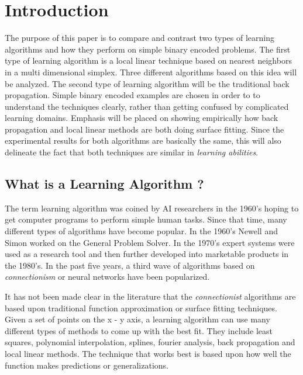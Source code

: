 \parskip 0.20in
\textheight 8.75in
\textwidth 6.0in
\topmargin -0.25in
\oddsidemargin 0.40in


\baselineskip 0.30in

\chapter{Introduction}
		
	The purpose of this paper is to compare and contrast two types
of learning algorithms and how they perform on simple binary encoded
problems.  The first type of learning algorithm is a local linear
technique based on nearest neighbors in a multi dimensional simplex.
Three different algorithms based on this idea will be analyzed.  The
second type of learning algorithm will be the traditional back
propagation.  Simple binary encoded examples are chosen in order to to
understand the techniques clearly, rather than getting confused by
complicated learning domains.  Emphasis will be placed on showing
empirically how back propagation and local linear methods are both
doing surface fitting.  Since the experimental results for both
algorithms are basically the same, this will also delineate the fact
that both techniques are similar in {\it learning abilities}.

\section{What is a Learning Algorithm ?}	

	The term learning algorithm was coined by AI researchers in
the 1960's hoping to get computer programs to perform simple human
tasks.  Since that time, many different types of algorithms have
become popular.  In the 1960's Newell and Simon worked on the General
Problem Solver.  In the 1970's expert systems were used as a research
tool and then further developed into marketable products in the
1980's.  In the past five years, a third wave of algorithms based on
{\it connectionism} or neural networks have been popularized.

	It has not been made clear in the literature that the {\it
connectionist} algorithms are based upon traditional function
approximation or surface fitting techniques.  Given a set of points on
the x - y axis, a learning algorithm can use many different types of
methods to come up with the best fit.  They include least squares,
polynomial interpolation, splines, fourier analysis, back propagation
and local linear methods.  The technique that works best is based upon
how well the function makes predictions or generalizations.

